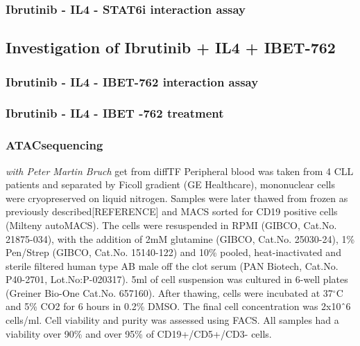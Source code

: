 \documentclass[11pt, a4paper, twosided]{book}
\begin{document}
\hypertarget{ibrutinib---il4---stat6i-interaction-assay}{%
\subsubsection{Ibrutinib - IL4 - STAT6i interaction assay}\label{ibrutinib---il4---stat6i-interaction-assay}}

\hypertarget{investigation-of-ibrutinib-il4-ibet-762}{%
\subsection{Investigation of Ibrutinib + IL4 + IBET-762}\label{investigation-of-ibrutinib-il4-ibet-762}}

\hypertarget{ibrutinib---il4---ibet-762-interaction-assay}{%
\subsubsection{Ibrutinib - IL4 - IBET-762 interaction assay}\label{ibrutinib---il4---ibet-762-interaction-assay}}

\hypertarget{ibrutinib---il4---ibet--762-treatment}{%
\subsubsection{Ibrutinib - IL4 - IBET -762 treatment}\label{ibrutinib---il4---ibet--762-treatment}}

\hypertarget{atacsequencing}{%
\subsubsection{ATACsequencing}\label{atacsequencing}}

\emph{with Peter Martin Bruch} get from diffTF
Peripheral blood was taken from 4 CLL patients and separated by Ficoll gradient (GE Healthcare), mononuclear cells were cryopreserved on liquid nitrogen. Samples were later thawed from frozen as previously described{[}REFERENCE{]} and MACS sorted for CD19 positive cells (Milteny autoMACS). The cells were resuspended in RPMI (GIBCO, Cat.No. 21875-034), with the addition of 2mM glutamine (GIBCO, Cat.No. 25030-24), 1\% Pen/Strep (GIBCO, Cat.No. 15140-122) and 10\% pooled, heat-inactivated and sterile filtered human type AB male off the clot serum (PAN Biotech, Cat.No. P40-2701, Lot.No:P-020317). 5ml of cell suspension was cultured in 6-well plates (Greiner Bio-One Cat.No. 657160). After thawing, cells were incubated at 37\(^\circ\)C and 5\% CO2 for 6 hours in 0.2\% DMSO. The final cell concentration was 2x10ˆ6 cells/ml. Cell viability and purity was assessed using FACS. All samples had a viability over 90\% and over 95\% of CD19+/CD5+/CD3- cells.
\end{document}
